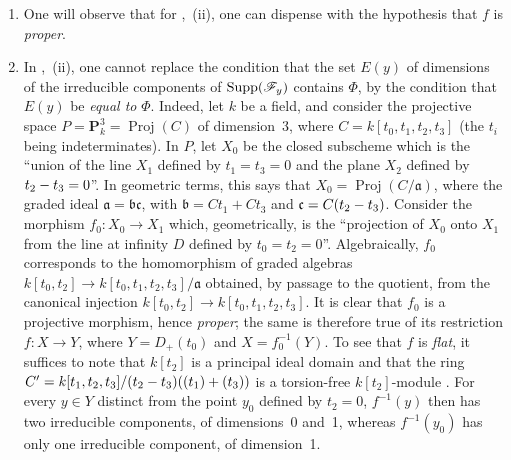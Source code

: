 \begin{remarks}[12.2.3]
\label{IV.12.2.3}
\begin{enumerate}[label=(\roman*)]
  \item One will observe that for ,~(ii), one can dispense with the hypothesis that $f$ is \emph{proper}.

  \item In ,~(ii), one cannot replace the condition that the set $E(y)$ of dimensions of the irreducible components of $\operatorname{Supp}(\mathscr{F}_y)$ contains $\Phi$, by the condition that $E(y)$ be \emph{equal to} $\Phi$.
Indeed, let $k$ be a field, and consider the projective space $P=\mathbf{P}_k^3=\operatorname{Proj}(C)$ of dimension~$3$, where $C=k[t_0,t_1,t_2,t_3]$ (the $t_i$ being indeterminates). In $P$, let $X_0$ be the closed subscheme which is the ``union of the line $X_1$ defined by $t_1=t_3=0$ and the plane $X_2$ defined by $t_2- t_3=0$''. In geometric terms, this says that $X_0=\operatorname{Proj}(C/\mathfrak{a})$, where the graded ideal $\mathfrak{a}=\mathfrak{b}\mathfrak{c}$, with $\mathfrak{b}=Ct_1+Ct_3$ and $\mathfrak{c}=C(t_2- t_3)$. Consider the morphism $f_0:X_0\to X_1$ which, geometrically, is the ``projection of $X_0$ onto $X_1$ from the line at infinity $D$ defined by $t_0=t_2=0$''. Algebraically, $f_0$ corresponds to the homomorphism of graded algebras $k[t_0,t_2]\longrightarrow k[t_0,t_1,t_2,t_3]/\mathfrak{a}$
obtained, by passage to the quotient, from the canonical injection $k[t_0,t_2]\to k[t_0,t_1,t_2,t_3]$.
It is clear that $f_0$ is a projective morphism, hence \emph{proper}; the same is therefore true of its restriction $f:X\to Y$, where $Y=D_+(t_0)$ and $X=f_0^{-1}(Y)$. To see that $f$ is \emph{flat}, it suffices to note that $k[t_2]$ is a principal ideal domain and that the ring $C'=k[t_1,t_2,t_3]/(t_2- t_3)((t_1)+(t_3))$
is a torsion-free $k[t_2]$-module .
For every $y\in Y$ distinct from the point $y_0$ defined by $t_2=0$, $f^{-1}(y)$ then has two irreducible components, of dimensions~0 and~1, whereas $f^{-1}(y_0)$ has only one irreducible component, of dimension~1.


\end{enumerate}
\end{remarks}
